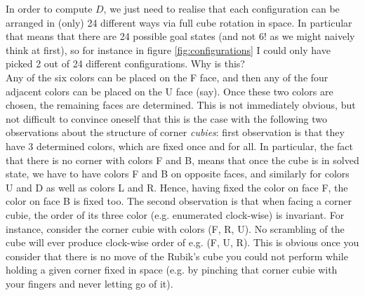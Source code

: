 In order to compute $D$, we just need to realise that each configuration can be arranged in (only) 24 different ways via full cube rotation in space. In particular that means that there are 24 possible goal states (and not 6! as we might naively think at first), so for instance in figure \ref{fig:configurations} I could only have picked 2 out of 24 different configurations. Why is this? 
\\
Any of the six colors can be placed on the F face, and then any of the four adjacent colors can be placed on the U face (say). Once these two colors are chosen, the remaining faces are determined. This is not immediately obvious, but not difficult to convince oneself that this is the case with the following two observations about the structure of corner \textit{cubies}: first observation is that they have 3 determined colors, which are fixed once and for all. In particular, the fact that there is no corner with colors F and B, means that once the cube is in solved state, we have to have colors F and B on opposite faces, and similarly for colors U and D as well as colors L and R. Hence, having fixed the color on face F, the color on face B is fixed too. The second observation is that when facing a corner cubie, the order of its three color (e.g. enumerated clock-wise) is invariant. For instance, consider the corner cubie with colors (F, R, U). No scrambling of the cube will ever produce clock-wise order of e.g. (F, U, R). This is obvious once you consider that there is no move of the Rubik's cube you could not perform while holding a given corner fixed in space (e.g. by pinching that corner cubie with your fingers and never letting go of it).
\\
\\
